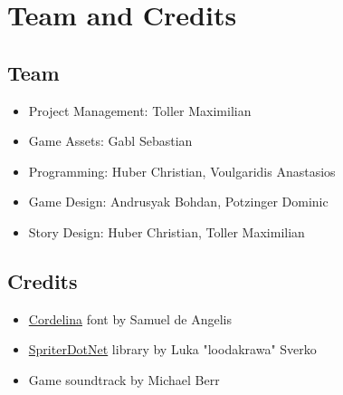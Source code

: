 \documentclass[a4paper]{scrreprt}
\begin{document}


\chapter{Team and Credits}

\section{Team}
\begin{itemize}
\item Project Management: Toller Maximilian
\item Game Assets: Gabl Sebastian
\item Programming: Huber Christian, Voulgaridis Anastasios
\item Game Design: Andrusyak Bohdan, Potzinger Dominic
\item Story Design: Huber Christian, Toller Maximilian
\end{itemize}

\section{Credits}
\begin{itemize}
\item \hyperlink{https://www.dafont.com/cordelina.font}{Cordelina} font by Samuel de Angelis
\item \hyperlink{https://github.com/loodakrawa/SpriterDotNet/tree/develop/SpriterDotNet.Unity}{SpriterDotNet} library by Luka "loodakrawa" Sverko
\item Game soundtrack by Michael Berr
\end{itemize}




%
%
\end{document}
